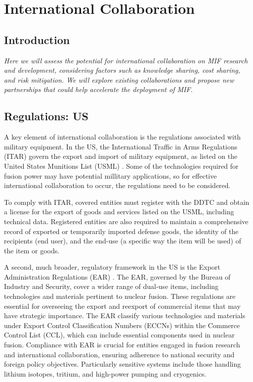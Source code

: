 \section{International Collaboration}
\subsection{Introduction}
\textit{Here we will assess the potential for international collaboration on MIF research and development, considering factors such as knowledge sharing, cost sharing, and risk mitigation. We will explore existing collaborations and propose new partnerships that could help accelerate the deployment of MIF.}  


\subsection{Regulations: US}

A key element of international collaboration is the regulations associated with military equipment. In the US, the International Traffic in Arms Regulations (ITAR) govern the export and import of military equipment, as listed on the United States Munitions List (USML) \cite{ecfrFederalRegister}. Some of the technologies required for fusion power may have potential millitary applications, so for effective international collaboration to occur, the regulations need to be considered.

To comply with ITAR, covered entities must register with the DDTC and obtain a license for the export of goods and services listed on the USML, including technical data. Registered entities are also required to maintain a comprehensive record of exported or temporarily imported defense goods, the identity of the recipients (end user), and the end-use (a specific way the item will be used) of the item or goods.

A second, much broader, regulatory framework in the US is the Export Administration Regulations (EAR) \cite{docExportAdministration}. The EAR, governed by the Bureau of Industry and Security, cover a wider range of dual-use items, including technologies and materials pertinent to nuclear fusion. These regulations are essential for overseeing the export and reexport of commercial items that may have strategic importance. The EAR classify various technologies and materials under Export Control Classification Numbers (ECCNs) within the Commerce Control List (CCL), which can include essential components used in nuclear fusion. Compliance with EAR is crucial for entities engaged in fusion research and international collaboration, ensuring adherence to national security and foreign policy objectives. Particularly sensitive systems include those handling lithium isotopes, tritium, and high-power pumping and cryogenics. 

